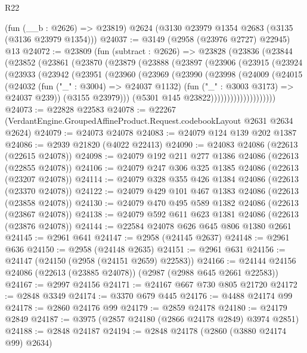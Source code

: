 \begin{lexlean}{R22}
\begin{coremodule}
    (fun (__b : @2626) => @23819)
    @2624
    (@3130 @23979 @1354 @2683 (@3135 (@3136 @23979 @1354)))
@24037 := @3149 (@2958 (@23976 @2727) @22945) @13
@24072 := @23809
    (fun (subtract : @2626) =>
    @23828
      (@23836
        (@23844
          (@23852
            (@23861
              (@23870
                (@23879
                  (@23888
                    (@23897
                      (@23906
                        (@23915
                          (@23924
                            (@23933
                              (@23942
                                (@23951
                                  (@23960
                                    (@23969
                                      (@23990
                                        (@23998
                                          (@24009
                                            (@24015
                                              (@24032
                                                (fun ("_" : @3004) => @24037 @1132)
                                                (fun ("_" : @3003 @3173) => @24037 @239))
                                              (@3155 @23979)))
                                          (@5301 @145 @23822))))))))))))))))))))
@24073 := @22828 @22583
@24078 := @22267 (VerdantEngine.GroupedAffineProduct.Request.codebookLayout @2631 @2634 @2624)
@24079 := @24073 @24078
@24083 := @24079 @124 @139 @202 @1387
@24086 := @2939 @21820 (@4022 @22413)
@24090 := @24083 @24086 (@22613 (@22615 @24078))
@24098 := @24079 @192 @211 @277 @1386 @24086 (@22613 (@22855 @24078))
@24106 := @24079 @247 @306 @325 @1385 @24086 (@22613 (@23207 @24078))
@24114 := @24079 @328 @355 @426 @1384 @24086 (@22613 (@23370 @24078))
@24122 := @24079 @429 @101 @467 @1383 @24086 (@22613 (@23858 @24078))
@24130 := @24079 @470 @495 @589 @1382 @24086 (@22613 (@23867 @24078))
@24138 := @24079 @592 @611 @623 @1381 @24086 (@22613 (@23876 @24078))
@24144 := @22584 @24078 @626 @645 @806 @1380 @2661
@24145 := @2961 @641
@24147 := @2958 (@24145 @2637)
@24148 := @2961 @636
@24150 := @2958 (@24148 @2635)
@24151 := @2961 @631
@24156 := @24147 (@24150 (@2958 (@24151 @2659) @22583))
@24166 := @24144 @24156 @24086 (@22613 (@23885 @24078)) (@2987 (@2988 @645 @2661 @22583))
@24167 := @2997 @24156
@24171 := @24167 @667 @730 @805 @21720
@24172 := @2848 @3349
@24174 := @3370 @679 @445
@24176 := @4488 @24174 @99
@24178 := @2860 @24176 @99
@24179 := @2859 @24178
@24180 := @24179 @2849
@24187 := @3975 (@2857 @24180 (@2866 @24178 @2849) @3974 @2851)
@24188 := @2848 @24187
@24194 := @2848 @24178 (@2860 (@3880 @24174 @99) @2634)

\end{coremodule}
\end{lexlean}
